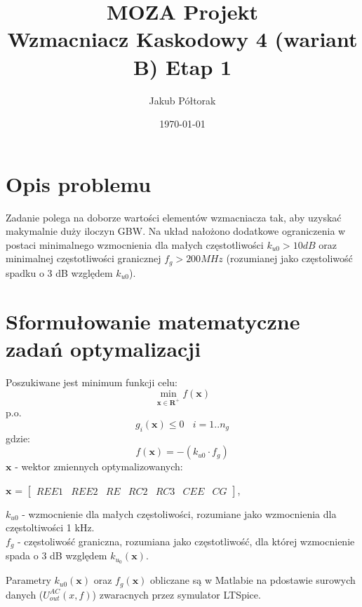 \documentclass{article}
\title{\huge  \Huge \textbf{MOZA Projekt} \\ \textbf{Wzmacniacz Kaskodowy 4 (wariant B)}}
\date{\today}
\author{ \LARGE Jakub Półtorak}
\begin{document}
\maketitle
{}
\newpage
{}
\tableofcontents

\pagebreak

\begin{center}
	\title{ \huge \textbf{Etap 1}}
\end{center}


\section*{Opis problemu}
Zadanie polega na doborze wartości elementów wzmacniacza tak, aby uzyskać makymalnie duży iloczyn
GBW. Na układ nałożono dodatkowe ograniczenia w postaci minimalnego wzmocnienia dla małych częstotliwości $k_{u0} > 10 dB$ oraz minimalnej częstotliwości
granicznej $f_g > 200 MHz$ (rozumianej jako częstoliwość spadku o 3 dB względem $k_{u0}$).
\section{Sformułowanie matematyczne zadań optymalizacji}
Poszukiwane jest minimum funkcji celu:
\[ \min\limits_{\textbf{x}\in \mathbf{R}^+  } f(\textbf{x}) \]
p.o.
\[ g_{i}(\textbf{x}) \leq 0 \ \ \ \  i=1..n_g\]
gdzie:
\[ f(\textbf{x}) = -(k_{u0}\cdot f_g)\]
\(\textbf{x}\) - wektor zmiennych optymalizowanych: \\
\begin{center}
	$\textbf{x}$ =
	$\begin{bmatrix}
			REE1 & REE2 & RE & RC2 & RC3 & CEE & CG
		\end{bmatrix}$,
\end{center}
\(k_{u0}\) - wzmocnienie dla małych częstoliwości, rozumiane jako wzmocnienia dla częstoltiwości 1 kHz.\\
\(f_{g}\) - częstoliwość graniczna, rozumiana jako częstotliwość, dla której wzmocnienie
spada o 3 dB względem $k_{u_{0}}(\textbf{x}) $.

Parametry $k_{u0}(\textbf{x})$ oraz $f_g(\textbf{x})$ obliczane są w Matlabie na pdostawie surowych danych ($U^{AC}_{out}(x,f)$) zwaracnych
przez symulator LTSpice.
\end{document}
